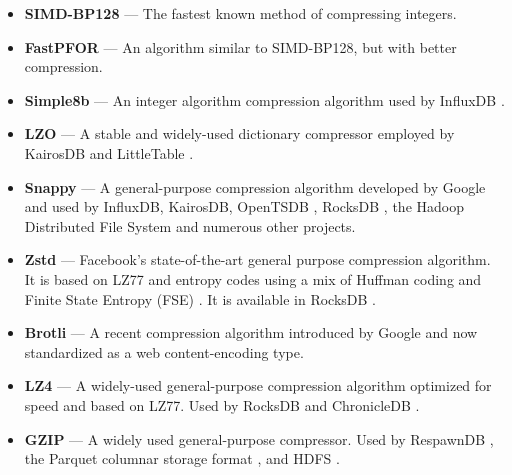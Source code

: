 \begin{itemize}[leftmargin=4mm]
\item \textbf{SIMD-BP128} \cite{fastpfor} --- The fastest known method of compressing integers.
\item \textbf{FastPFOR} \cite{fastpfor} --- An algorithm similar to SIMD-BP128, but with better compression.
\item \textbf{Simple8b} \cite{simple8b} --- An integer algorithm compression algorithm used by InfluxDB \cite{influxDB}.
\item \textbf{LZO} \cite{lzo} --- A stable and widely-used dictionary compressor employed by KairosDB \cite{kairosDB} and LittleTable \cite{littleTable}.
\item \textbf{Snappy} \cite{snappy} --- A general-purpose compression algorithm developed by Google and used by InfluxDB, KairosDB, OpenTSDB \cite{openTSDB}, RocksDB \cite{rocksDB}, the Hadoop Distributed File System \cite{hdfs} and numerous other projects.
\item \textbf{Zstd} \cite{zstd} --- Facebook's state-of-the-art general purpose compression algorithm. It is based on LZ77 and entropy codes using a mix of Huffman coding and Finite State Entropy (FSE) \cite{fse}. It is available in RocksDB \cite{rocksDB}.
\item \textbf{Brotli} \cite{brotli} --- A recent compression algorithm introduced by Google and now standardized as a web content-encoding type.
\item \textbf{LZ4} \cite{lz4} --- A widely-used general-purpose compression algorithm optimized for speed and based on LZ77. Used by RocksDB and ChronicleDB \cite{chronicleDB}.
\item \textbf{GZIP} \cite{gzip} --- A widely used general-purpose compressor. Used by RespawnDB \cite{respawnDB}, the Parquet columnar storage format \cite{parquet}, and HDFS \cite{hdfs}.
\end{itemize}

